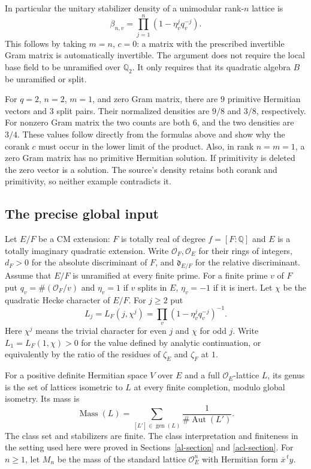 In particular the unitary stabilizer density of a unimodular
rank-$n$ lattice is
\begin{equation}\label{md-stabilizer-density}
                 \beta_{n,v}=
                       \prod_{j=1}^n(1-\eta_v^j q_v^{-j}).
\end{equation}
This follows by taking $m=n$, $c=0$: a matrix with the prescribed
invertible Gram matrix is automatically invertible. The argument
does not require the local base field to be unramified over
$\mathbb Q_2$. It only requires that its quadratic algebra $B$
be unramified or split.

\begin{example}\label{md-degenerate-test}
For $q=2$, $n=2$, $m=1$, and zero Gram matrix, there are $9$
primitive Hermitian vectors and $3$ split pairs. Their normalized
densities are $9/8$ and $3/8$, respectively. For nonzero Gram
matrix the two counts are both $6$, and the two densities are
$3/4$. These values follow directly from the formulas above and
show why the corank $c$ must occur in the lower limit of the product.
Also, in rank $n=m=1$, a zero Gram matrix has no primitive
Hermitian solution. If primitivity is deleted the zero vector is
a solution. The source's density retains both corank and
primitivity, so neither example contradicts it.
\end{example}

\subsection{The precise global input}

Let $E/F$ be a CM extension: $F$ is totally real of degree
$f=[F:\mathbb Q]$ and $E$ is a totally imaginary quadratic
extension. Write $\mathcal O_F,\mathcal O_E$ for their rings of
integers, $d_F>0$ for the absolute discriminant of $F$, and
$\mathfrak d_{E/F}$ for the relative discriminant. Assume that
$E/F$ is unramified at every finite prime. For a finite prime $v$
of $F$ put $q_v=\#(\mathcal O_F/v)$ and
$\eta_v=1$ if $v$ splits in $E$, $\eta_v=-1$ if it is inert.
Let $\chi$ be the quadratic Hecke character of $E/F$.
For $j\geq2$ put
\[
                L_j=L_F(j,\chi^j)
                   =\prod_v(1-\eta_v^j q_v^{-j})^{-1}.
\]
Here $\chi^j$ means the trivial character for even $j$ and
$\chi$ for odd $j$. Write $L_1=L_F(1,\chi)>0$ for the value
defined by analytic continuation, or equivalently by the ratio
of the residues of $\zeta_E$ and $\zeta_F$ at $1$.

For a positive definite Hermitian space $V$ over $E$ and a full
$\mathcal O_E$-lattice $L$, its genus is the set of lattices
isometric to $L$ at every finite completion, modulo global
isometry. Its mass is
\[
                \operatorname{Mass}(L)
                   =\sum_{[L']\in\operatorname{gen}(L)}
                                  \frac1{\#\operatorname{Aut}(L')}.
\]
The class set and stabilizers are finite. The class interpretation
and finiteness in the setting used here were proved in
Sections~\ref{al-section} and \ref{acl-section}.
For $n\geq1$, let $M_n$ be the mass of the standard lattice
$\mathcal O_E^n$ with Hermitian form $\overline x^{\,t}y$.

